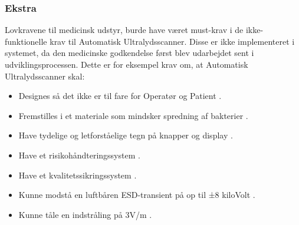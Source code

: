 \subsubsection{Ekstra}
Lovkravene til medicinsk udstyr, burde have været must-krav i de ikke-funktionelle krav til Automatisk Ultralydsscanner. Disse er ikke implementeret i systemet, da den medicinske godkendelse først blev udarbejdet sent i udviklingsprocessen. Dette er for eksempel krav om, at Automatisk Ultralydsscanner skal: 
\begin{itemize}
\item Designes så det ikke er til fare for Operatør og Patient \cite{MDD}. 
\item Fremstilles i et materiale som mindsker spredning af bakterier \cite{MDD}. 
\item Have tydelige og letforståelige tegn på knapper og display \cite{MDD}.
\item Have et risikohåndteringssystem \cite{13485}.
\item Have et kvalitetssikringssystem \cite{14971}. 
\item Kunne modstå en luftbåren ESD-transient på op til ±8 kiloVolt \cite{60601}.
\item Kunne tåle en indstråling på 3V/m \cite{60601}.
\end{itemize}